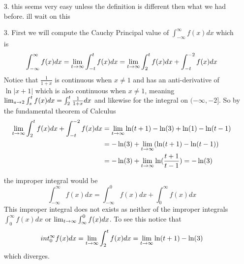 \documentclass[12pt]{amsart}
\begin{document}
\begin{itemize}
   \item[3.] this seems very easy unless the definition is different then what we had before. ill wait on this
   \item[3.] First we will compute the Cauchy Principal value of $\int_{-\infty}^\infty f(x)dx$ which is 
            \[\int_{-\infty}^\infty f(x)dx =\lim_{t\rightarrow\infty}\int_{-t}^t f(x)dx 
            = \lim_{t\rightarrow\infty}\int_{2}^t f(x)dx + \int_{-t}^{-2} f(x)dx \]
            Notice that $\frac{1}{1+x}$ is continuous when $x\neq 1$ and has an anti-derivative of $\ln|x+1|$ 
            which is also continuous when $x\neq 1$, meaning $\lim_{s\rightarrow 2}\int_{s}^t f(x)dx=\int_{2}^t \frac{1}{1+x}dx$ 
            and likewise for the integral on $(-\infty,-2]$. So by the fundamental theorem of Calculus
            \begin{align*}
               \lim_{t\rightarrow\infty}\int_{2}^t f(x)dx + \int_{-t}^{-2} f(x)dx 
               &=\lim_{t\rightarrow\infty} \ln(t+1)-\ln(3)+ \ln(1)-\ln(t-1)\\
               &=-\ln(3)+\lim_{t\rightarrow\infty}(\ln(t+1)-\ln(t-1))\\
               &=-\ln(3)+\lim_{t\rightarrow\infty}\ln(\frac{t+1}{t-1})=-\ln(3)
            \end{align*}

            the improper integral would be 
            \[\int_{-\infty}^\infty f(x)dx = \int_{-\infty}^0 f(x)dx +\int_{0}^\infty f(x)dx\]
            This improper integral does not exists as neither of the improper integrals
            $\int_{0}^\infty f(x)dx$ or $\lim_{t\rightarrow\infty}\int_{\infty}^0 f(x)dx$. To see this notice that
            \[int_{0}^\infty f(x)dx=\lim_{t\rightarrow\infty}\int_{2}^t f(x)dx=\lim_{t\rightarrow\infty} \ln(t+1)-\ln(3)\]
            which diverges.


\end{itemize}
\end{document}
